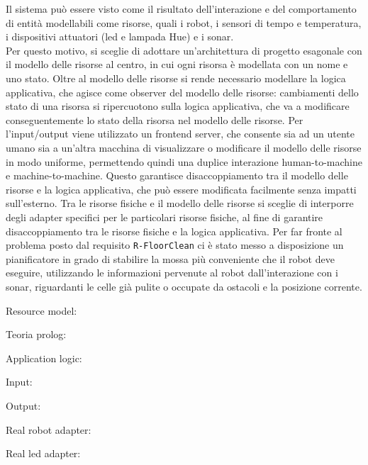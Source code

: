 \documentclass{llncs}
\newcommand{\version}{7}
\newcommand{\code}[1]{{\color{blue}\small{\texttt{#1}}}}
\begin{document}
Il sistema può essere visto come il risultato dell'interazione e del comportamento di entità modellabili come risorse, quali i robot, i sensori di tempo e temperatura, i dispositivi attuatori (led e lampada Hue) e i sonar. \\
Per questo motivo, si sceglie di adottare un'architettura di progetto esagonale con il modello delle risorse al centro, in cui ogni risorsa è modellata con un nome e uno stato.
Oltre al modello delle risorse si rende necessario modellare la logica applicativa, che agisce come observer del modello delle risorse: cambiamenti dello stato di una risorsa si ripercuotono sulla logica applicativa, che va a modificare conseguentemente lo stato della risorsa nel modello delle risorse.
Per l'input/output viene utilizzato un frontend server, che consente sia ad un utente umano sia a un'altra macchina di visualizzare o modificare il modello delle risorse in modo uniforme, permettendo quindi una duplice interazione human-to-machine e machine-to-machine.
Questo garantisce disaccoppiamento tra il modello delle risorse e la logica applicativa, che può essere modificata facilmente senza impatti sull'esterno.
Tra le risorse fisiche e il modello delle risorse si sceglie di interporre degli adapter specifici per le particolari risorse fisiche, al fine di garantire disaccoppiamento tra le risorse fisiche e la logica applicativa.
Per far fronte al problema posto dal requisito \code{R-FloorClean} ci è stato messo a disposizione un pianificatore in grado di stabilire la mossa più conveniente che il robot deve eseguire, utilizzando le informazioni pervenute al robot dall'interazione con i sonar, riguardanti le celle già pulite o occupate da ostacoli e la posizione corrente.

Resource model:

Teoria prolog:

Application logic:

Input:

Output:

Real robot adapter:

Real led adapter:

\end{document}
